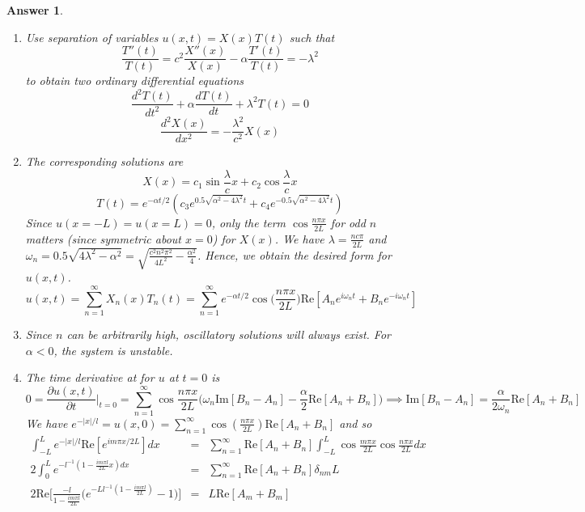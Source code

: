 \documentclass[a4paper]{article}
\newtheorem{ans}{Answer}[section]
\theoremstyle{new}
\begin{document}
\begin{ans}\leavevmode
\begin{enumerate}[label=(\roman*)]
    \item Use separation of variables $u(x,t)=X(x)T(t)$ such that
$$\frac{T''(t)}{T(t)}=c^2\frac{X''(x)}{X(x)}-\alpha\frac{T'(t)}{T(t)}=-\lambda^2$$
to obtain two ordinary differential equations
\begin{equation}
\frac{d^2T(t)}{dt^2}+\alpha \frac{dT(t)}{dt}+\lambda^2T(t)=0\tag{time}
\end{equation}
\begin{equation}
    \frac{d^2X(x)}{dx^2}=-\frac{\lambda^2}{c^2}X(x)\tag{position}
\end{equation}
\item The corresponding solutions are
$$X(x)=c_1\sin\frac{\lambda}{c}x+c_2\cos\frac{\lambda}{c}x$$
$$T(t)=e^{-\alpha t/2}(c_3e^{0.5\sqrt{\alpha^2-4\lambda^2}t}+c_4e^{-0.5\sqrt{\alpha^2-4\lambda^2}t})$$
Since $u(x=-L)=u(x=L)=0$, only the term $\cos\frac{n\pi x}{2L}$ for odd $n$ matters (since symmetric about $x=0$) for $X(x)$. We have $\lambda=\frac{nc\pi}{2L}$ and $\omega_n=0.5\sqrt{4\lambda^2-\alpha^2}=\sqrt{\frac{c^2n^2\pi^2}{4L^2}-\frac{\alpha^2}{4}}$. Hence, we obtain the desired form for $u(x,t)$.
$$u(x,t)=\sum_{n=1}^\infty X_n(x)T_n(t)=\sum_{n=1}^\infty e^{-\alpha t/2}\cos\bigg(\frac{n\pi x}{2L}\bigg)\text{Re}[A_ne^{i\omega_nt}+B_ne^{-i\omega_nt}]$$
\item Since $n$ can be arbitrarily high, oscillatory solutions will always exist. For $\alpha<0$, the system is unstable.
\item The time derivative at for $u$ at $t=0$ is
$$0=\frac{\partial u(x,t)}{\partial t}\bigg|_{t=0}=\sum_{n=1}^\infty\cos\frac{n\pi x}{2L}\bigg(\omega_n\text{Im}[B_n-A_n]-\frac{\alpha}{2}\text{Re}[A_n+B_n]\bigg)\implies\text{Im}[B_n-A_n]=\frac{\alpha}{2\omega_n}\text{Re}[A_n+B_n]$$
We have $e^{-|x|/l}=u(x,0)=\sum_{n=1}^\infty\cos(\frac{n\pi x}{2L})\text{Re}[A_n+B_n]$ and so
\begin{eqnarray}
\int_{-L}^Le^{-|x|/l}\text{Re}[e^{im\pi x/2L}]dx&=&\sum_{n=1}^\infty\text{Re}[A_n+B_n]\int_{-L}^L\cos\frac{m\pi x}{2L}\cos\frac{n\pi x}{2L}dx\nonumber\\2\int_{0}^Le^{-l^{-1}(1-\frac{im\pi l}{2L}x)dx}&=&\sum_{n=1}^\infty\text{Re}[A_n+B_n]\delta_{nm}L\nonumber\\2\text{Re}\bigg[\frac{-l}{1-\frac{im\pi l}{2L}}\bigg(e^{-Ll^{-1}(1-\frac{im\pi l}{2L})}-1\bigg)\bigg]&=&L\text{Re}[A_m+B_m]\nonumber
\end{eqnarray}

\end{enumerate}
\end{ans}
\end{document}
